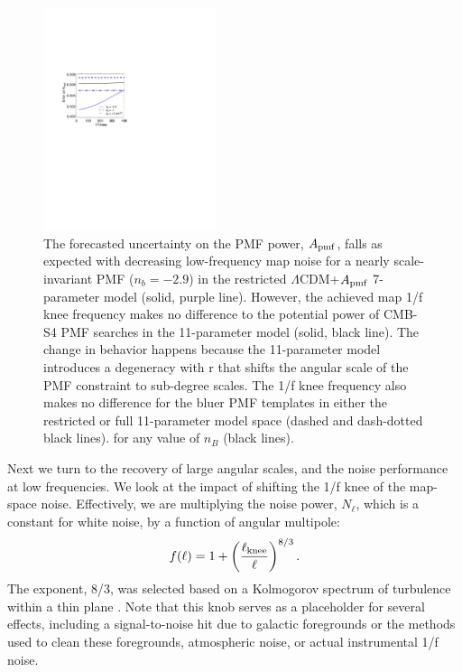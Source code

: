 \documentclass[apj]{emulateapj}
\newcommand{\apmf}{\ensuremath{A_{\rm pmf}}}
\newcommand{\lcdm}{\ensuremath{\Lambda}CDM}
\newcommand{\be}{\begin{equation}}
\newcommand{\ee}{\end{equation}}
\begin{document}
\begin{figure}[htb]\centering
\includegraphics[width=0.45\textwidth,clip,trim={1.5cm 12.5cm 11cm 7.5cm}]{pmf_knee.pdf}
  \caption[Map knee dependence]{
  The forecasted uncertainty on the PMF power, \apmf{}, falls as expected with decreasing low-frequency map noise for a nearly scale-invariant PMF ($n_b = -2.9$) in the restricted \lcdm{}+\apmf{} 7-parameter model (solid, purple line). 
  However,  the achieved map 1/f knee frequency makes no difference to the potential power of CMB-S4 PMF searches in the 11-parameter model (solid, black line). 
  The change in behavior happens because the 11-parameter model introduces a degeneracy with r that shifts the angular scale of the PMF constraint to sub-degree scales. 
  The 1/f knee frequency also makes no difference for the bluer PMF templates in either the restricted or full 11-parameter model space (dashed and dash-dotted black lines). 
   for any value of $n_B$ (black lines). 
    \label{fig:knee}
  }
\end{figure}

Next we turn to the recovery of large angular scales, and the noise performance at low frequencies. 
We look at the impact of shifting the 1/f knee of the map-space noise. 
Effectively, we are multiplying the noise power, $N_\ell$, which is a constant for white noise,  by a function of angular multipole:
\be \label{eqn:knee}
f(\ell) = 1 + \left(\frac{\ell_{\rm knee}}{\ell}\right)^{8/3}.
\ee 
The exponent, 8/3, was selected based on a Kolmogorov spectrum of turbulence within a thin plane \citep{lay00}. %
Note that this knob  serves as a placeholder for several effects, including a signal-to-noise hit due to galactic foregrounds or the methods used to clean these foregrounds, atmospheric noise, or actual instrumental 1/f noise. 
\end{document}
